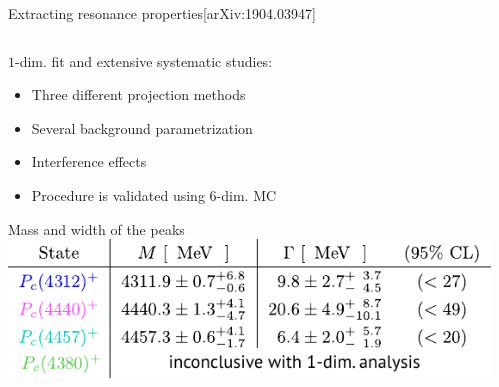 \documentclass[aspectratio=169]{beamer}
\newcommand{\paper}[1]{{\scriptsize[#1]}}
\begin{document}
\begin{frame}{Extracting resonance properties}{\paper{arXiv:1904.03947}}
\begin{columns}
    \begin{column}{0.5\textwidth}
        $1$-dim. fit and extensive systematic studies:
        \begin{itemize}
            \item Three different projection methods
            \item Several background parametrization
            \item Interference effects
            \item Procedure is validated using $6$-dim. MC
        \end{itemize}
        \begin{exampleblock}{Mass and width of the peaks}
            \centering
            \includegraphics[width=\textwidth]{figs/PcNew/Table_1_ed.pdf}
        \end{exampleblock}
    \end{column}
    \begin{column}{0.49\textwidth}
        \vspace{-10mm}
        \begin{overlayarea}{\textwidth}{\textheight}

\end{overlayarea}
\end{column}
\end{columns}
\end{frame}
\end{document}
